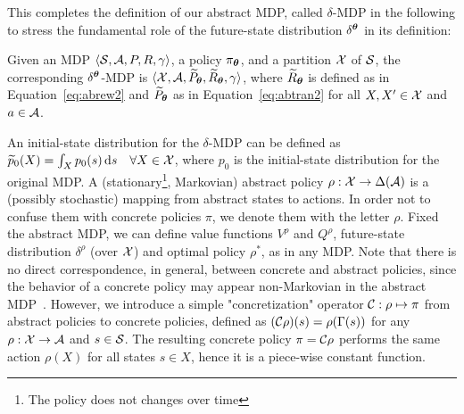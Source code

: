 This completes the definition of our abstract \ac{MDP}, called $\delta$-MDP in the following to stress the fundamental role of the future-state distribution $\delta^{\boldsymbol{\theta}}$ in its definition:
%
\begin{definition}\label{def:abmdp}
	Given an MDP $\langle\mathcal{S}, \mathcal{A}, P, R, \gamma\rangle$, a policy $\pi_{\boldsymbol{\theta}}$, and a partition $\mathcal{X}$ of $\mathcal{S}$, the corresponding $\delta^{\boldsymbol{\theta}}$-MDP is $\langle\mathcal{X}, \mathcal{A}, \widetilde{P}_{\boldsymbol{\theta}}, \widetilde{R}_{\boldsymbol{\theta}}, \gamma\rangle$, where $\widetilde{R}_{\boldsymbol{\theta}}$ is defined as in Equation~\eqref{eq:abrew2} and $\widetilde{P}_{\boldsymbol{\theta}}$ as in Equation~\eqref{eq:abtran2} for all $X,X'\in\mathcal{X}$ and $a\in\mathcal{A}$.
\end{definition}
%
\noindent An initial-state distribution for the $\delta$-\ac{MDP} can be defined as $\widetilde{p}_0(X) = \int_{X}p_0(s)\,\mathrm{d} s\quad\forall X\in\mathcal{X}$, where $p_0$ is the initial-state distribution for the original \ac{MDP}.
%
A (stationary\footnote{The policy does not changes over time}, Markovian) abstract policy $\rho: \mathcal{X} \to \Delta(\mathcal{A})$ is a (possibly stochastic) mapping from abstract states to actions. In order not to confuse them with concrete policies $\pi$, we denote them with the letter $\rho$. Fixed the abstract \ac{MDP}, we can define value functions $V^{\rho}$ and $Q^{\rho}$, future-state distribution $\delta^{\rho}$ (over $\mathcal{X}$) and optimal policy $\rho^{*}$, as in any \ac{MDP}. Note that there is no direct correspondence, in general, between concrete and abstract policies, since the behavior of a concrete policy may appear non-Markovian in the abstract \ac{MDP}~\citep{lihong2006towards}.
However, we introduce a simple "concretization" operator $\mathcal{C}: \rho \mapsto \pi$ from abstract policies to concrete policies, defined as
$(\mathcal{C}\rho)(s) = \rho(\Gamma(s))$
for any $\rho:\mathcal{X}\to\mathcal{A}$ and $s\in\mathcal{S}$. The resulting concrete policy $\pi = \mathcal{C}\rho$ performs the same action $\rho(X)$ for all states $s\in X$, hence it is a piece-wise constant function.

